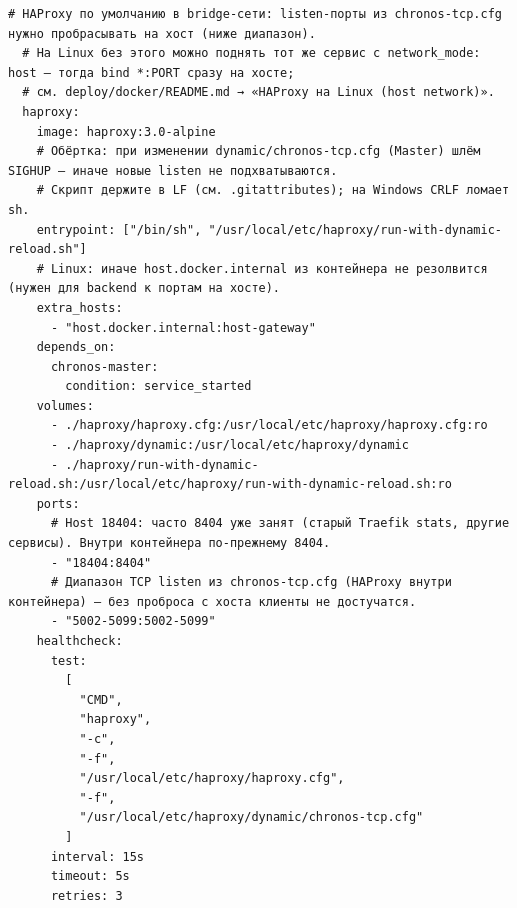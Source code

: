 \begin{lstlisting}[style=code,language={},caption={deploy/docker/docker-compose.yml}]
  # HAProxy по умолчанию в bridge-сети: listen-порты из chronos-tcp.cfg нужно пробрасывать на хост (ниже диапазон).
  # На Linux без этого можно поднять тот же сервис с network_mode: host — тогда bind *:PORT сразу на хосте;
  # см. deploy/docker/README.md → «HAProxy на Linux (host network)».
  haproxy:
    image: haproxy:3.0-alpine
    # Обёртка: при изменении dynamic/chronos-tcp.cfg (Master) шлём SIGHUP — иначе новые listen не подхватываются.
    # Скрипт держите в LF (см. .gitattributes); на Windows CRLF ломает sh.
    entrypoint: ["/bin/sh", "/usr/local/etc/haproxy/run-with-dynamic-reload.sh"]
    # Linux: иначе host.docker.internal из контейнера не резолвится (нужен для backend к портам на хосте).
    extra_hosts:
      - "host.docker.internal:host-gateway"
    depends_on:
      chronos-master:
        condition: service_started
    volumes:
      - ./haproxy/haproxy.cfg:/usr/local/etc/haproxy/haproxy.cfg:ro
      - ./haproxy/dynamic:/usr/local/etc/haproxy/dynamic
      - ./haproxy/run-with-dynamic-reload.sh:/usr/local/etc/haproxy/run-with-dynamic-reload.sh:ro
    ports:
      # Host 18404: часто 8404 уже занят (старый Traefik stats, другие сервисы). Внутри контейнера по-прежнему 8404.
      - "18404:8404"
      # Диапазон TCP listen из chronos-tcp.cfg (HAProxy внутри контейнера) — без проброса с хоста клиенты не достучатся.
      - "5002-5099:5002-5099"
    healthcheck:
      test:
        [
          "CMD",
          "haproxy",
          "-c",
          "-f",
          "/usr/local/etc/haproxy/haproxy.cfg",
          "-f",
          "/usr/local/etc/haproxy/dynamic/chronos-tcp.cfg"
        ]
      interval: 15s
      timeout: 5s
      retries: 3


\end{lstlisting}
